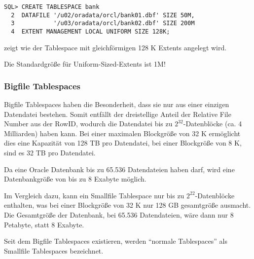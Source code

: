           \begin{lstlisting}[caption={Uniform-Sized-Extents},label=admin106,language=oracle_sql]
SQL> CREATE TABLESPACE bank
  2  DATAFILE '/u02/oradata/orcl/bank01.dbf' SIZE 50M,
  3           '/u03/oradata/orcl/bank02.dbf' SIZE 200M
  4  EXTENT MANAGEMENT LOCAL UNIFORM SIZE 128K;
          \end{lstlisting}
           zeigt wie der Tablespace  mit gleichf\"ormigen 128 K Extents angelegt wird.
          \begin{merke}
            Die Standardgr\"o\ss{}e f\"ur Uniform-Sized-Extents ist 1M!
          \end{merke}
        \subsubsection{Bigfile Tablespaces}
          Bigfile Tablespaces haben die Besonderheit, dass sie nur aus einer einzigen Datendatei bestehen. Somit entf\"allt der dreistellige Anteil der Relative File Number aus der RowID, wodurch die Datendatei bis zu $2^{32}$-Datenbl\"ocke (ca. 4 Milliarden) haben kann. Bei einer maximalen Blockgr\"o\ss{}e von 32 K erm\"oglicht dies eine Kapazit\"at von 128 TB pro Datendatei, bei einer Blockgr\"o\ss{}e von 8 K, sind es 32 TB pro Datendatei.

          Da eine Oracle Datenbank bis zu 65.536 Datendateien haben darf, wird eine Datenbankgr\"o\ss{}e von bis zu 8 Exabyte m\"oglich.

          Im Vergleich dazu, kann ein Smallfile Tablespace nur bis zu $2^{22}$-Datenbl\"ocke enthalten, was bei einer Blockgr\"o\ss{}e von 32 K nur 128 GB gesamtgr\"o\ss{}e ausmacht. Die Gesamtgr\"o\ss{}e der Datenbank, bei 65.536 Datendateien, w\"are dann nur 8 Petabyte, statt 8 Exabyte.
          \begin{merke}
            Seit dem Bigfile Tablespaces existieren, werden \enquote{normale Tablespaces} als Smallfile Tablespaces bezeichnet.
          \end{merke}
          \begin{literaturinternet}
            \item \cite{REFRN0042}
            \item \cite{doctbtthtm}
          \end{literaturinternet}

